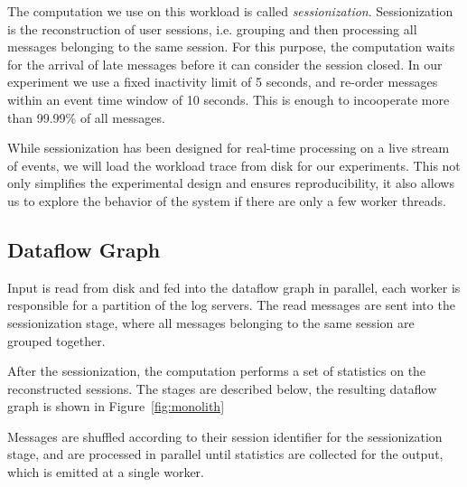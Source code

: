 The computation we use on this workload is called \emph{sessionization}. Sessionization
is the reconstruction of user sessions, i.e. grouping and then processing all
messages belonging to the same session. For this purpose, the computation waits for
the arrival of late messages before it can consider the session closed. In
our experiment we use a fixed inactivity limit of 5 seconds, and re-order messages
within an event time window of 10 seconds. This is enough to incooperate more
than 99.99\% of all messages. 

While sessionization has been designed for real-time processing on a live
stream of events, we will load the workload trace from disk for our experiments.
This not only simplifies the experimental design and ensures reproducibility,
it also allows us to explore the behavior of the system if there are only a
few worker threads.

\subsection{Dataflow Graph}

Input is read from disk and fed into the dataflow graph in parallel, each worker
is responsible for a partition of the log servers. The read messages are sent
into the sessionization stage, where all messages belonging to the same session
are grouped together.

After the sessionization, the computation performs a set of statistics on the
reconstructed sessions. The stages are described below, the resulting dataflow
graph is shown in Figure~\ref{fig:monolith}

Messages are shuffled according to their session identifier for the
sessionization stage, and are processed in parallel until statistics are
collected for the output, which is emitted at a single worker. 

